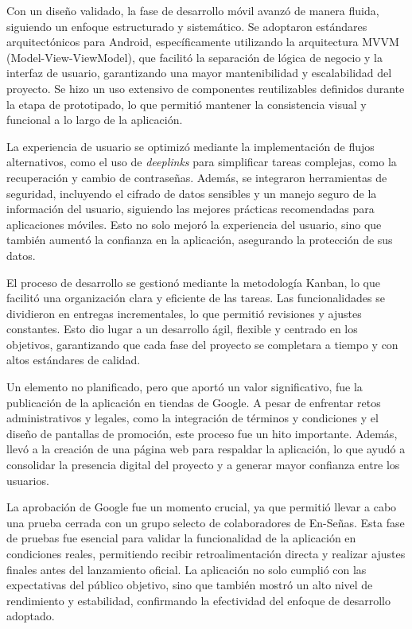 Con un diseño validado, la fase de desarrollo móvil avanzó de manera fluida, siguiendo un enfoque estructurado y sistemático. Se adoptaron estándares arquitectónicos para Android, específicamente utilizando la arquitectura MVVM (Model-View-ViewModel), que facilitó la separación de lógica de negocio y la interfaz de usuario, garantizando una mayor mantenibilidad y escalabilidad del proyecto. Se hizo un uso extensivo de componentes reutilizables definidos durante la etapa de prototipado, lo que permitió mantener la consistencia visual y funcional a lo largo de la aplicación.

La experiencia de usuario se optimizó mediante la implementación de flujos alternativos, como el uso de \textit{deeplinks} para simplificar tareas complejas, como la recuperación y cambio de contraseñas. Además, se integraron herramientas de seguridad, incluyendo el cifrado de datos sensibles y un manejo seguro de la información del usuario, siguiendo las mejores prácticas recomendadas para aplicaciones móviles. Esto no solo mejoró la experiencia del usuario, sino que también aumentó la confianza en la aplicación, asegurando la protección de sus datos.

El proceso de desarrollo se gestionó mediante la metodología Kanban, lo que facilitó una organización clara y eficiente de las tareas. Las funcionalidades se dividieron en entregas incrementales, lo que permitió revisiones y ajustes constantes. Esto dio lugar a un desarrollo ágil, flexible y centrado en los objetivos, garantizando que cada fase del proyecto se completara a tiempo y con altos estándares de calidad.

Un elemento no planificado, pero que aportó un valor significativo, fue la publicación de la aplicación en tiendas de Google. A pesar de enfrentar retos administrativos y legales, como la integración de términos y condiciones y el diseño de pantallas de promoción, este proceso fue un hito importante. Además, llevó a la creación de una página web para respaldar la aplicación, lo que ayudó a consolidar la presencia digital del proyecto y a generar mayor confianza entre los usuarios.

La aprobación de Google fue un momento crucial, ya que permitió llevar a cabo una prueba cerrada con un grupo selecto de colaboradores de En-Señas. Esta fase de pruebas fue esencial para validar la funcionalidad de la aplicación en condiciones reales, permitiendo recibir retroalimentación directa y realizar ajustes finales antes del lanzamiento oficial. La aplicación no solo cumplió con las expectativas del público objetivo, sino que también mostró un alto nivel de rendimiento y estabilidad, confirmando la efectividad del enfoque de desarrollo adoptado.



